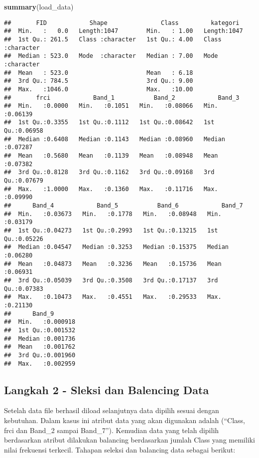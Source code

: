 \documentclass[]{article}
\newenvironment{Shaded}{\begin{snugshade}}{\end{snugshade}}
\newcommand{\KeywordTok}[1]{\textcolor[rgb]{0.13,0.29,0.53}{\textbf{#1}}}
\newcommand{\NormalTok}[1]{#1}
\begin{document}
\begin{Shaded}
\begin{Highlighting}[]
\KeywordTok{summary}\NormalTok{(load_data)}
\end{Highlighting}
\end{Shaded}

\begin{verbatim}
##       FID            Shape               Class         kategori        
##  Min.   :   0.0   Length:1047        Min.   : 1.00   Length:1047       
##  1st Qu.: 261.5   Class :character   1st Qu.: 4.00   Class :character  
##  Median : 523.0   Mode  :character   Median : 7.00   Mode  :character  
##  Mean   : 523.0                      Mean   : 6.18                     
##  3rd Qu.: 784.5                      3rd Qu.: 9.00                     
##  Max.   :1046.0                      Max.   :10.00                     
##       frci            Band_1           Band_2            Band_3       
##  Min.   :0.0000   Min.   :0.1051   Min.   :0.08066   Min.   :0.06139  
##  1st Qu.:0.3355   1st Qu.:0.1112   1st Qu.:0.08642   1st Qu.:0.06958  
##  Median :0.6408   Median :0.1143   Median :0.08960   Median :0.07287  
##  Mean   :0.5680   Mean   :0.1139   Mean   :0.08948   Mean   :0.07382  
##  3rd Qu.:0.8128   3rd Qu.:0.1162   3rd Qu.:0.09168   3rd Qu.:0.07679  
##  Max.   :1.0000   Max.   :0.1360   Max.   :0.11716   Max.   :0.09990  
##      Band_4            Band_5           Band_6            Band_7       
##  Min.   :0.03673   Min.   :0.1778   Min.   :0.08948   Min.   :0.03179  
##  1st Qu.:0.04273   1st Qu.:0.2993   1st Qu.:0.13215   1st Qu.:0.05226  
##  Median :0.04547   Median :0.3253   Median :0.15375   Median :0.06280  
##  Mean   :0.04873   Mean   :0.3236   Mean   :0.15736   Mean   :0.06931  
##  3rd Qu.:0.05039   3rd Qu.:0.3508   3rd Qu.:0.17137   3rd Qu.:0.07383  
##  Max.   :0.10473   Max.   :0.4551   Max.   :0.29533   Max.   :0.21130  
##      Band_9        
##  Min.   :0.000918  
##  1st Qu.:0.001532  
##  Median :0.001736  
##  Mean   :0.001762  
##  3rd Qu.:0.001960  
##  Max.   :0.002959
\end{verbatim}

\subsection{Langkah 2 - Sleksi dan Balencing
Data}\label{langkah-2---sleksi-dan-balencing-data}

Setelah data file berhasil diload selanjutnya data dipilih sesuai dengan
kebutuhan. Dalam kasus ini atribut data yang akan digunakan adalah
(``Class, frci dan Band\_2 sampai Band\_7''). Kemudian data yang telah
dipilih berdasarkan atribut dilakukan balancing berdasarkan jumlah Class
yang memiliki nilai frekuensi terkecil. Tahapan seleksi dan balancing
data sebagai berikut:
\end{document}
